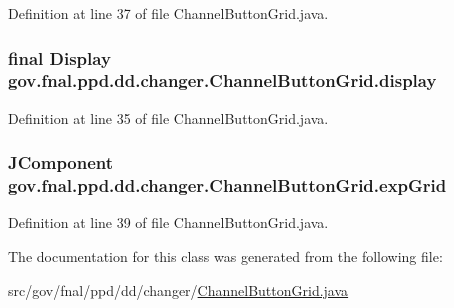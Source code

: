 Definition at line 37 of file Channel\-Button\-Grid.\-java.

\hypertarget{classgov_1_1fnal_1_1ppd_1_1dd_1_1changer_1_1ChannelButtonGrid_a3c06b51489dcaacd16f6efcefe06bcaa}{
\subsubsection[{display}]{\setlength{\rightskip}{0pt plus 5cm}final {\bf Display} gov.\-fnal.\-ppd.\-dd.\-changer.\-Channel\-Button\-Grid.\-display\hspace{0.3cm}{\ttfamily [protected]}}}\label{classgov_1_1fnal_1_1ppd_1_1dd_1_1changer_1_1ChannelButtonGrid_a3c06b51489dcaacd16f6efcefe06bcaa}


Definition at line 35 of file Channel\-Button\-Grid.\-java.

\hypertarget{classgov_1_1fnal_1_1ppd_1_1dd_1_1changer_1_1ChannelButtonGrid_a28bdcf8d7b7664142d4360cd82f1b725}{
\subsubsection[{exp\-Grid}]{\setlength{\rightskip}{0pt plus 5cm}J\-Component gov.\-fnal.\-ppd.\-dd.\-changer.\-Channel\-Button\-Grid.\-exp\-Grid\hspace{0.3cm}{\ttfamily [protected]}}}\label{classgov_1_1fnal_1_1ppd_1_1dd_1_1changer_1_1ChannelButtonGrid_a28bdcf8d7b7664142d4360cd82f1b725}


Definition at line 39 of file Channel\-Button\-Grid.\-java.



The documentation for this class was generated from the following file\-:\begin{DoxyCompactItemize}
\item 
src/gov/fnal/ppd/dd/changer/\hyperlink{ChannelButtonGrid_8java}{Channel\-Button\-Grid.\-java}\end{DoxyCompactItemize}

